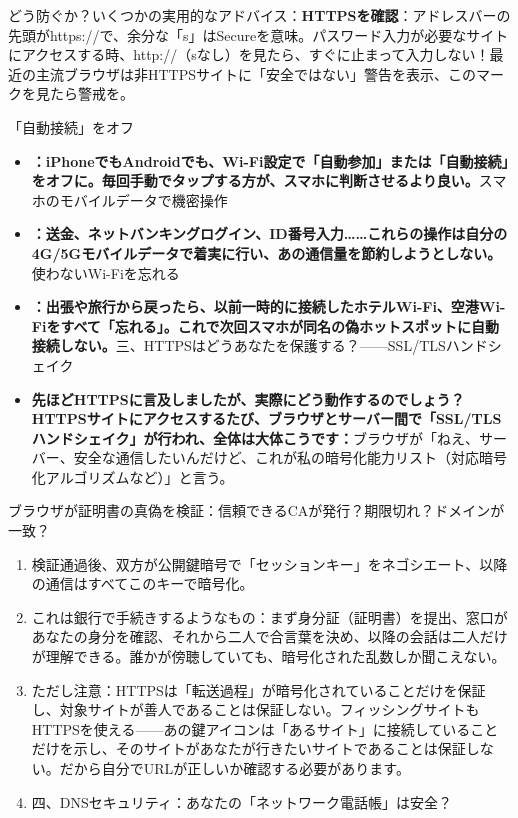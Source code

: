 どう防ぐか？いくつかの実用的なアドバイス：\textbf{HTTPSを確認}：アドレスバーの先頭がhttps://で、余分な「s」はSecureを意味。パスワード入力が必要なサイトにアクセスする時、http://（sなし）を見たら、すぐに止まって入力しない！最近の主流ブラウザは非HTTPSサイトに「安全ではない」警告を表示、このマークを見たら警戒を。

「自動接続」をオフ

\begin{itemize}
  \item \textbf{：iPhoneでもAndroidでも、Wi-Fi設定で「自動参加」または「自動接続」をオフに。毎回手動でタップする方が、スマホに判断させるより良い。}スマホのモバイルデータで機密操作
  \item \textbf{：送金、ネットバンキングログイン、ID番号入力……これらの操作は自分の4G/5Gモバイルデータで着実に行い、あの通信量を節約しようとしない。}使わないWi-Fiを忘れる
  \item \textbf{：出張や旅行から戻ったら、以前一時的に接続したホテルWi-Fi、空港Wi-Fiをすべて「忘れる」。これで次回スマホが同名の偽ホットスポットに自動接続しない。}三、HTTPSはどうあなたを保護する？——SSL/TLSハンドシェイク
  \item \textbf{先ほどHTTPSに言及しましたが、実際にどう動作するのでしょう？HTTPSサイトにアクセスするたび、ブラウザとサーバー間で「SSL/TLSハンドシェイク」が行われ、全体は大体こうです：}ブラウザが「ねえ、サーバー、安全な通信したいんだけど、これが私の暗号化能力リスト（対応暗号化アルゴリズムなど）」と言う。
\end{itemize}


ブラウザが証明書の真偽を検証：信頼できるCAが発行？期限切れ？ドメインが一致？

\begin{enumerate}
  \item 検証通過後、双方が公開鍵暗号で「セッションキー」をネゴシエート、以降の通信はすべてこのキーで暗号化。
  \item これは銀行で手続きするようなもの：まず身分証（証明書）を提出、窓口があなたの身分を確認、それから二人で合言葉を決め、以降の会話は二人だけが理解できる。誰かが傍聴していても、暗号化された乱数しか聞こえない。
  \item ただし注意：HTTPSは「転送過程」が暗号化されていることだけを保証し、対象サイトが善人であることは保証しない。フィッシングサイトもHTTPSを使える——あの鍵アイコンは「あるサイト」に接続していることだけを示し、そのサイトがあなたが行きたいサイトであることは保証しない。だから自分でURLが正しいか確認する必要があります。
  \item 四、DNSセキュリティ：あなたの「ネットワーク電話帳」は安全？
\end{enumerate}

